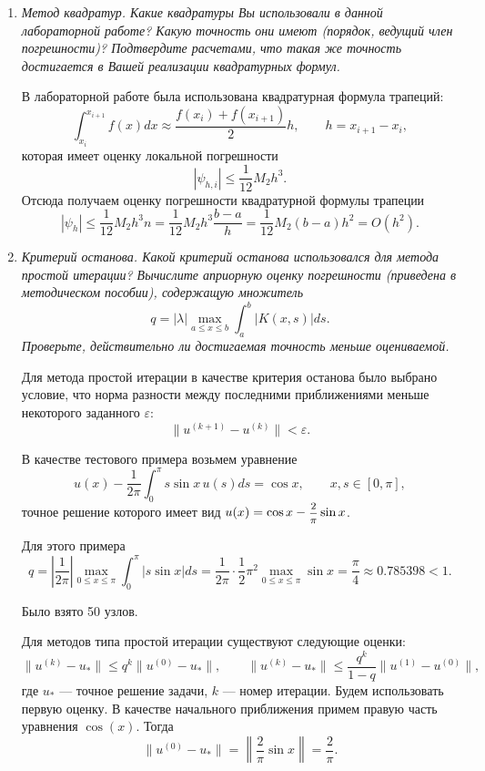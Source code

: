 \documentclass[12pt, a4paper]{article}
\begin{document}
	\begin{enumerate}
		\item \textit{Метод квадратур. Какие квадратуры Вы использовали в данной лабораторной работе? Какую точность они имеют (порядок, ведущий член погрешности)? Подтвердите расчетами, что такая же точность достигается в Вашей реализации квадратурных формул.}
		\smallskip
		
		В лабораторной работе была использована квадратурная формула трапеций:
		\[
		\int_{x_i}^{x_{i+1}} f(x) dx \approx \frac{f(x_i)+f(x_{i+1})}2 h, \qquad h = x_{i+1} - x_i,
		\]
		которая имеет оценку локальной погрешности
		\[
		|\psi_{h, i}| \le \frac1{12} M_2 h^3.
		\]
		Отсюда получаем оценку погрешности квадратурной формулы трапеции
		\[
		|\psi_h| \le \frac1{12} M_2 h^3 n = \frac1{12} M_2 h^3 \frac{b-a}{h} = \frac1{12} M_2 (b-a) h^2 = O(h^2).
		\]
		
		
		\item \textit{Критерий останова. Какой критерий останова использовался для метода простой итерации? Вычислите априорную оценку погрешности (приведена в методическом пособии), содержащую множитель}
		\[
		q = |\lambda| \max_{a \le x \le b} \int_a^b |K(x, s)| ds.
		\]
		\textit{Проверьте, действительно ли достигаемая точность меньше оцениваемой.}
		\smallskip
		
		Для метода простой итерации в качестве критерия останова было выбрано условие, что норма разности между последними приближениями меньше некоторого заданного $\varepsilon$:
		\[
		\|u^{(k+1)} - u^{(k)}\| < \varepsilon.
		\]
		
		В качестве тестового примера возьмем уравнение
		\[
		u(x) - \frac1{2\pi} \int_0^\pi s \sin x\,u(s) ds = \cos x, \qquad x, s \in [0,\pi],
		\]
		точное решение которого имеет вид $u(x) = \cos x - \hbox{\footnotesize$\displaystyle\frac{2}{\pi}$} \sin x$.
		
		Для этого примера
		\[
		q = \left|\frac1{2\pi}\right| \max_{0 \le x \le \pi} \int_0^\pi |s \sin x| ds = \frac1{2\pi} \cdot \frac12 \pi^2 \max_{0 \le x \le \pi} \sin x = \frac\pi4 \approx 0.785398 < 1.
		\]
		
		Было взято 50 узлов.
		
		Для методов типа простой итерации существуют следующие оценки:
		\[
		\|u^{(k)} - u_*\| \le q^k \|u^{(0)} - u_*\|, \qquad \|u^{(k)} - u_*\| \le \frac{q^k}{1-q} \|u^{(1)} - u^{(0)}\|,
		\]
		где $u_*$ --- точное решение задачи, $k$ --- номер итерации. Будем использовать первую оценку. В качестве начального приближения примем правую часть уравнения $\cos(x)$. Тогда
		\[
		\|u^{(0)} - u_*\| = \left\|\frac2\pi \sin x\right\| = \frac2\pi.
		\]
		

\end{enumerate}
\end{document}
